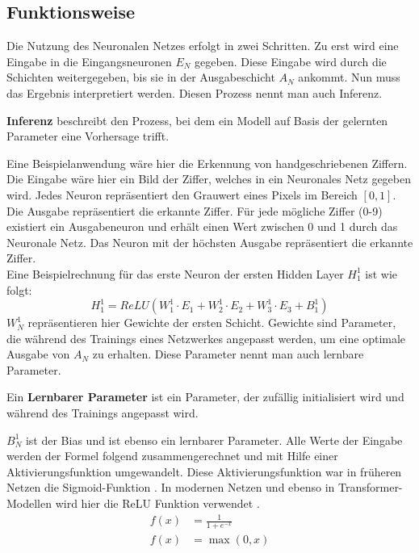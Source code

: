 \subsection{Funktionsweise}
Die Nutzung des Neuronalen Netzes erfolgt in zwei Schritten.
Zu erst wird eine Eingabe in die Eingangsneuronen $E_N$ gegeben.
Diese Eingabe wird durch die Schichten weitergegeben, bis sie in der Ausgabeschicht $A_N$ ankommt.
Nun muss das Ergebnis interpretiert werden. Diesen Prozess nennt man auch Inferenz.\\
\begin{definition}\label{def:inferenz}
    \textbf{Inferenz} beschreibt den Prozess, bei dem ein Modell auf Basis der gelernten Parameter eine Vorhersage trifft.
\end{definition}

Eine Beispielanwendung wäre hier die Erkennung von handgeschriebenen Ziffern.
Die Eingabe wäre hier ein Bild der Ziffer, welches in ein Neuronales Netz gegeben wird.
Jedes Neuron repräsentiert den Grauwert eines Pixels im Bereich $[0,1]$.
Die Ausgabe repräsentiert die erkannte Ziffer.
Für jede mögliche Ziffer (0-9) existiert ein Ausgabeneuron und erhält einen Wert zwischen 0 und 1 durch das Neuronale Netz.
Das Neuron mit der höchsten Ausgabe repräsentiert die erkannte Ziffer.\\

Eine Beispielrechnung für das erste Neuron der ersten Hidden Layer $H^1_1$ ist wie folgt:
\begin{equation}
    H^1_1=ReLU(W^1_1\cdot E_1 + W^1_2\cdot E_2 + W^1_3\cdot E_3 + B^1_1)
\end{equation}
$W^1_N$ repräsentieren hier Gewichte der ersten Schicht.
Gewichte sind Parameter, die während des Trainings eines Netzwerkes angepasst werden, um eine optimale Ausgabe von $A_N$ zu erhalten.
Diese Parameter nennt man auch lernbare Parameter.\\

\begin{definition}\label{def:lernbare-parameter}
    Ein \textbf{Lernbarer Parameter} ist ein Parameter, der zufällig initialisiert wird und während des Trainings angepasst wird.
\end{definition}

$B^1_N$ ist der Bias und ist ebenso ein lernbarer Parameter.
Alle Werte der Eingabe werden der Formel folgend zusammengerechnet und mit Hilfe einer Aktivierungsfunktion umgewandelt.
Diese Aktivierungsfunktion war in früheren Netzen die Sigmoid-Funktion .
In modernen Netzen und ebenso in Transformer-Modellen wird hier die ReLU Funktion verwendet .
\begin{align}
    f(x) &= \frac{1}{1+e^{-x}}\label{eq:sigmoid}\\
    f(x) &= \max(0,x) \label{eq:relu}
\end{align}

